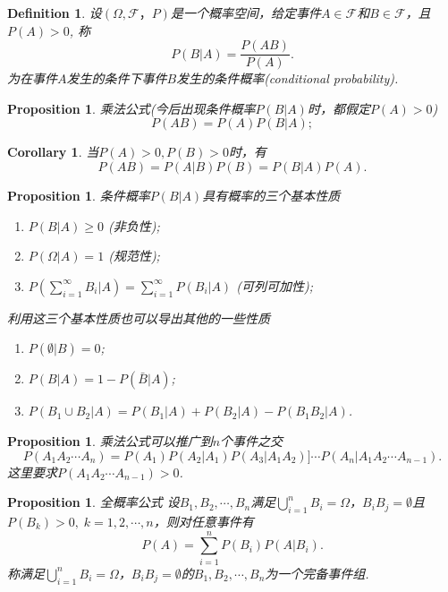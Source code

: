 \documentclass{article}
\newtheorem{corollary}[theorem]{Corollary}
\newtheorem{proposition}[theorem]{Proposition}
\newtheorem{definition}[theorem]{Definition}
\begin{document}
\begin{definition}
\rm 设$(\Omega,\mathscr{F}，P)$是一个概率空间，给定事件$A \in \mathscr{F}$和$B \in \mathscr{F}$，且$P(A) > 0$, 称
$$
P(B|A) = \frac{P(AB)}{P(A)}.
$$
为在事件$A$发生的条件下事件$B$发生的{\color{red}条件概率}(conditional probability).
\end{definition}

\begin{proposition}
\rm 乘法公式(今后出现条件概率$P(B|A)$时，都假定$P(A) > 0$)
$$
P(AB) = P(A)P(B|A);
$$
\end{proposition}

\begin{corollary}
\rm 当$P(A) > 0,P(B) > 0$时，有
$$
P(AB) = P(A|B)P(B) = P(B|A)P(A).
$$
\end{corollary}

\begin{proposition}
\rm 条件概率$P(B|A)$具有概率的三个基本性质
\begin{enumerate}
	\item $P(B|A) \geq 0$ (非负性);
	\item $P(\Omega|A) = 1$ (规范性);
	\item $P(\sum\limits_{i=1}^{\infty} B_i | A) = \sum\limits_{i=1}^{\infty}P(B_i | A)$ (可列可加性); 
\end{enumerate}

利用这三个基本性质也可以导出其他的一些性质
\begin{enumerate}
	\item $P(\emptyset | B) = 0$;
	\item $P(B|A) = 1 - P(\bar{B} | A)$;
	\item $P(B_1 \cup B_2 | A) = P(B_1 | A) + P(B_2 | A) - P(B_1B_2 |A)$. 
\end{enumerate}
\end{proposition}

\begin{proposition}
\rm 乘法公式可以推广到$n$个事件之交
$$
P(A_1A_2\cdots A_n) = P(A_1)P(A_2|A_1)P(A_3|A_1A_2)]\cdots P(A_n|A_1A_2\cdots A_{n-1}).
$$
这里要求$P(A_1A_2\cdots A_{n-1}) > 0$. 
\end{proposition}

\begin{proposition}
\rm {\color{red}全概率公式} 设$B_1,B_2,\cdots,B_n$满足$\bigcup\limits_{i=1}^n B_i = \Omega$，$B_iB_j = \emptyset$且$P(B_k) > 0,\; k=1,2,\cdots,n$，则对任意事件有
$$
P(A) = \sum\limits_{i=1}^n P(B_i)P(A|B_i).
$$
称满足$\bigcup\limits_{i=1}^n B_i = \Omega$，$B_iB_j = \emptyset$的$B_1,B_2,\cdots,B_n$为一个{\color{red}完备事件组}.
\end{proposition}
\end{document}
